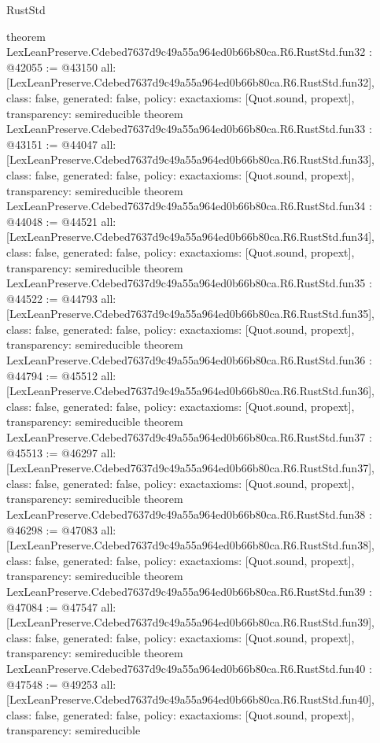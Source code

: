 \begin{lexlean}{RustStd}
\begin{coremodule}
{}
theorem LexLeanPreserve.Cdebed7637d9c49a55a964ed0b66b80ca.R6.RustStd.fun32 : @42055 := @43150 {
  all: [LexLeanPreserve.Cdebed7637d9c49a55a964ed0b66b80ca.R6.RustStd.fun32],
  class: false,
  generated: false,
  policy: exact{axioms: [Quot.sound, propext]},
  transparency: semireducible
}
theorem LexLeanPreserve.Cdebed7637d9c49a55a964ed0b66b80ca.R6.RustStd.fun33 : @43151 := @44047 {
  all: [LexLeanPreserve.Cdebed7637d9c49a55a964ed0b66b80ca.R6.RustStd.fun33],
  class: false,
  generated: false,
  policy: exact{axioms: [Quot.sound, propext]},
  transparency: semireducible
}
theorem LexLeanPreserve.Cdebed7637d9c49a55a964ed0b66b80ca.R6.RustStd.fun34 : @44048 := @44521 {
  all: [LexLeanPreserve.Cdebed7637d9c49a55a964ed0b66b80ca.R6.RustStd.fun34],
  class: false,
  generated: false,
  policy: exact{axioms: [Quot.sound, propext]},
  transparency: semireducible
}
theorem LexLeanPreserve.Cdebed7637d9c49a55a964ed0b66b80ca.R6.RustStd.fun35 : @44522 := @44793 {
  all: [LexLeanPreserve.Cdebed7637d9c49a55a964ed0b66b80ca.R6.RustStd.fun35],
  class: false,
  generated: false,
  policy: exact{axioms: [Quot.sound, propext]},
  transparency: semireducible
}
theorem LexLeanPreserve.Cdebed7637d9c49a55a964ed0b66b80ca.R6.RustStd.fun36 : @44794 := @45512 {
  all: [LexLeanPreserve.Cdebed7637d9c49a55a964ed0b66b80ca.R6.RustStd.fun36],
  class: false,
  generated: false,
  policy: exact{axioms: [Quot.sound, propext]},
  transparency: semireducible
}
theorem LexLeanPreserve.Cdebed7637d9c49a55a964ed0b66b80ca.R6.RustStd.fun37 : @45513 := @46297 {
  all: [LexLeanPreserve.Cdebed7637d9c49a55a964ed0b66b80ca.R6.RustStd.fun37],
  class: false,
  generated: false,
  policy: exact{axioms: [Quot.sound, propext]},
  transparency: semireducible
}
theorem LexLeanPreserve.Cdebed7637d9c49a55a964ed0b66b80ca.R6.RustStd.fun38 : @46298 := @47083 {
  all: [LexLeanPreserve.Cdebed7637d9c49a55a964ed0b66b80ca.R6.RustStd.fun38],
  class: false,
  generated: false,
  policy: exact{axioms: [Quot.sound, propext]},
  transparency: semireducible
}
theorem LexLeanPreserve.Cdebed7637d9c49a55a964ed0b66b80ca.R6.RustStd.fun39 : @47084 := @47547 {
  all: [LexLeanPreserve.Cdebed7637d9c49a55a964ed0b66b80ca.R6.RustStd.fun39],
  class: false,
  generated: false,
  policy: exact{axioms: [Quot.sound, propext]},
  transparency: semireducible
}
theorem LexLeanPreserve.Cdebed7637d9c49a55a964ed0b66b80ca.R6.RustStd.fun40 : @47548 := @49253 {
  all: [LexLeanPreserve.Cdebed7637d9c49a55a964ed0b66b80ca.R6.RustStd.fun40],
  class: false,
  generated: false,
  policy: exact{axioms: [Quot.sound, propext]},
  transparency: semireducible
}
\end{coremodule}
\end{lexlean}
